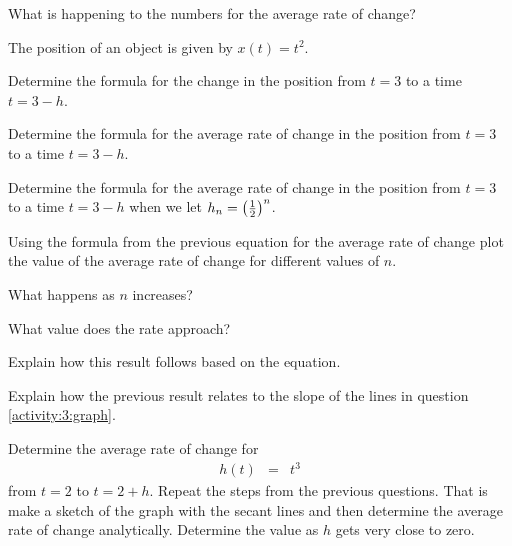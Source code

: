 \begin{problem}
\begin{subproblem}
    \item What is happening to the numbers for the average rate of change?

  \end{subproblem}

  \clearpage

\item The position of an object is given by $x(t)=t^2$.
  \begin{subproblem}
    \item Determine the formula for the change in the position from
      $t=3$ to a time $t=3-h$.
      \vfill

    \item Determine the formula for the average rate of change in the
      position from $t=3$ to a time $t=3-h$.
      \vfill

    \item Determine the formula for the average rate of change in the
      position from $t=3$ to a time $t=3-h$ when we let $h_n=\left(\frac{1}{2}\right)^n$.

      \vspace{3em}

  \end{subproblem}


  \clearpage

\item Using the formula from the previous equation for the average
  rate of change plot the value of the average rate of change for
  different values of $n$.

  \scalebox{0.7}{}

  \begin{subproblem}
    \item What happens as $n$ increases?
      \vspace{3em}
    \item What value does the rate approach?
      \vspace{3em}
    \item Explain how this result follows based on the equation.
      \vspace{3em}
  \end{subproblem}

  \item Explain how the previous result relates to the slope of the
    lines in question \ref{activity:3:graph}.

    \vfill

  \clearpage

  \item Determine the average rate of change for
    \begin{eqnarray*}
      h(t) & = & t^3
    \end{eqnarray*}
    from $t=2$ to $t=2+h$. Repeat the steps from the previous questions.
    That is make a sketch of the graph with the secant lines and then
    determine the average rate of change analytically. Determine the
    value as $h$ gets very close to zero.

    \vfill

\end{problem}

